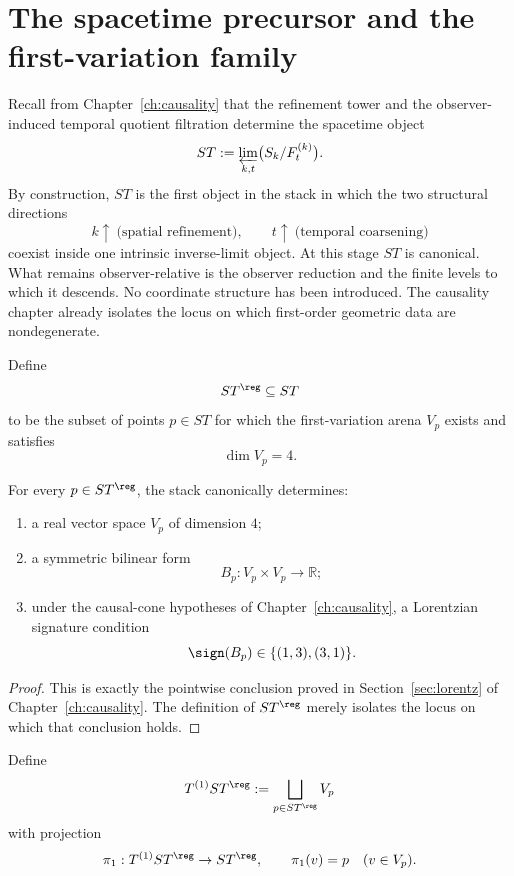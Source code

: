 \section{The spacetime precursor and the first-variation family}
\label{sec:connection-precursor}
Recall from Chapter~\ref{ch:causality} that the refinement tower and the
observer-induced temporal quotient filtration determine the spacetime
object
\[
	ST:=\varprojlim_{k,t}\bigl(S_k/F_t^{(k)}\bigr).
\]
By construction, \(ST\) is the first object in the stack in which the
two structural directions
\[
	k\uparrow\ \text{(spatial refinement)},
	\qquad
	t\uparrow\ \text{(temporal coarsening)}
\]
coexist inside one intrinsic inverse-limit object.
At this stage \(ST\) is canonical.  What remains observer-relative is
the observer reduction and the finite levels to which it descends.  No
coordinate structure has been introduced.
The causality chapter already isolates the locus on which first-order
geometric data are nondegenerate.
\begin{definition}
	Define
	\[
		ST^{\reg}\subseteq ST
	\]
	to be the subset of points \(p\in ST\) for which the first-variation
	arena \(V_p\) exists and satisfies
	\[
		\dim V_p=4.
	\]
\end{definition}
\begin{proposition}
	\label{prop:connection-pointwise}
	For every \(p\in ST^{\reg}\), the stack canonically determines:
	\begin{enumerate}[label=\textup{(\roman*)}]
		\item
		      a real vector space \(V_p\) of dimension \(4\);
		\item
		      a symmetric bilinear form
		      \[
			      B_p:V_p\times V_p\to\mathbb R;
		      \]
		\item
		      under the causal-cone hypotheses of Chapter~\ref{ch:causality}, a
		      Lorentzian signature condition
		      \[
			      \sign(B_p)\in\{(1,3),(3,1)\}.
		      \]
	\end{enumerate}
\end{proposition}
\begin{proof}
	This is exactly the pointwise conclusion proved in
	Section~\ref{sec:lorentz} of Chapter~\ref{ch:causality}.  The
	definition of \(ST^{\reg}\) merely isolates the locus on which that
	conclusion holds.
\end{proof}
\begin{definition}
	\label{def:connection-first-bundle}
	Define
	\[
		T^{(1)}ST^{\reg}
		:=
		\bigsqcup_{p\in ST^{\reg}}V_p
	\]
	with projection
	\[
		\pi_1:T^{(1)}ST^{\reg}\to ST^{\reg},
		\qquad
		\pi_1(v)=p
		\quad (v\in V_p).
	\]
\end{definition}
